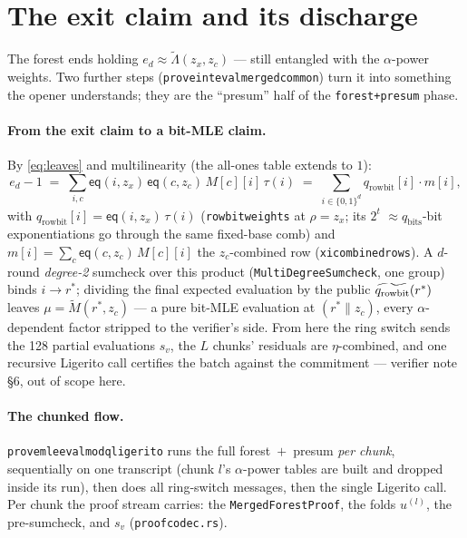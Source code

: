 \documentclass[11pt]{article}
\newcommand{\bits}{\{0,1\}}
\newcommand{\mle}[1]{\widetilde{#1}}
\newcommand{\eq}{\mathsf{eq}}
\newcommand{\code}[1]{{\def\_{\textunderscore\allowbreak}\texttt{#1}}}
\theoremstyle{definition}
\begin{document}
\section{The exit claim and its discharge}
\label{sec:discharge}

The forest ends holding $e_d \approx \mle{\Lambda}(z_x, z_c)$ --- still
entangled with the $\alpha$-power weights.  Two further steps
(\code{prove\_int\_eval\_merged\_common}) turn it into something the
opener understands; they are the ``presum'' half of the
\code{forest+presum} phase.

\paragraph{From the exit claim to a bit-MLE claim.}
By \eqref{eq:leaves} and multilinearity (the all-ones table extends to
$1$):
\[
  e_d - 1
  \;=\; \sum_{i, c} \eq(i, z_x)\,\eq(c, z_c)\, M[c][i]\,\tau(i)
  \;=\; \sum_{i \in \bits^d} q_{\mathrm{rowbit}}[i]\cdot m[i],
\]
with $q_{\mathrm{rowbit}}[i] = \eq(i, z_x)\,\tau(i)$
(\code{row\_bit\_weights} at $\rho = z_x$; its $2^t$
${\approx}q_{\mathrm{bits}}$-bit exponentiations go through the same
fixed-base comb) and $m[i] = \sum_c \eq(c, z_c)\,M[c][i]$ the
$z_c$-combined row (\code{xi\_combined\_rows}).  A $d$-round
\emph{degree-2} sumcheck over this product
(\code{MultiDegreeSumcheck}, one group) binds $i \to r^*$; dividing the
final expected evaluation by the public
$\smash{\mle{q_{\mathrm{rowbit}}}}(r^*)$ leaves
$\mu = \mle{M}(r^*, z_c)$ --- a pure bit-MLE evaluation at
$(r^* \| z_c)$, every $\alpha$-dependent factor stripped to the
verifier's side.  From here the ring switch sends the 128 partial
evaluations $s_v$, the $L$ chunks' residuals are $\eta$-combined, and
one recursive Ligerito call certifies the batch against the commitment
--- verifier note \S6, out of scope here.

\paragraph{The chunked flow.}
\code{prove\_mle\_eval\_mod\_q\_ligerito} runs the full
forest~$+$~presum \emph{per chunk}, sequentially on one transcript
(chunk $l$'s $\alpha$-power tables are built and dropped inside its
run), then does all ring-switch messages, then the single Ligerito
call.  Per chunk the proof stream carries: the \code{MergedForestProof},
the folds $u^{(l)}$, the pre-sumcheck, and $s_v$
(\code{proof\_codec.rs}).
\end{document}
